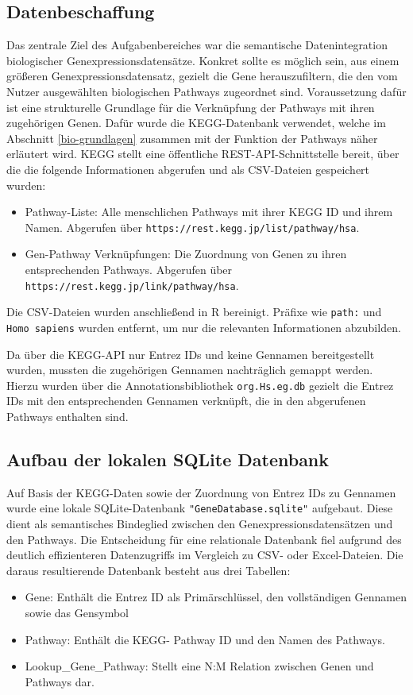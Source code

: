 \documentclass[12pt]{article}
\begin{document}
\subsection{Datenbeschaffung}
Das zentrale Ziel des Aufgabenbereiches war die semantische Datenintegration biologischer Genexpressionsdatensätze. Konkret sollte es möglich sein, aus einem größeren Genexpressionsdatensatz, gezielt die Gene herauszufiltern, die den vom Nutzer ausgewählten biologischen Pathways zugeordnet sind.
Voraussetzung dafür ist eine strukturelle Grundlage für die Verknüpfung der Pathways mit ihren zugehörigen Genen. Dafür wurde die KEGG-Datenbank verwendet, welche im Abschnitt \ref{bio-grundlagen} zusammen mit der Funktion der Pathways näher erläutert wird. KEGG stellt eine öffentliche REST-API-Schnittstelle bereit, über die die folgende Informationen abgerufen und als CSV-Dateien gespeichert wurden: 
\begin{itemize}
    \item Pathway-Liste: Alle menschlichen Pathways mit ihrer KEGG ID und ihrem Namen. Abgerufen über \texttt{https://\allowbreak rest.\allowbreak kegg.\allowbreak jp/\allowbreak list/\allowbreak pathway/\allowbreak hsa}.
    \item Gen-Pathway Verknüpfungen: Die Zuordnung von Genen zu ihren entsprechenden Pathways. Abgerufen über \texttt{https://\allowbreak rest.\allowbreak kegg.\allowbreak jp/\allowbreak link/\allowbreak pathway/\allowbreak hsa}.
\end{itemize}
\noindent Die CSV-Dateien wurden anschließend in R bereinigt. Präfixe wie \texttt{path:} und \texttt{Homo sapiens} wurden entfernt, um nur die relevanten Informationen abzubilden. 

\noindent Da über die KEGG-API nur Entrez IDs und keine Gennamen bereitgestellt wurden, mussten die zugehörigen Gennamen nachträglich gemappt werden. Hierzu wurden über die Annotationsbibliothek \texttt{org.Hs.eg.db} gezielt die Entrez IDs mit den entsprechenden Gennamen verknüpft, die in den abgerufenen Pathways enthalten sind.

\subsection{Aufbau der lokalen SQLite Datenbank}
Auf Basis der KEGG-Daten sowie der Zuordnung von Entrez IDs zu Gennamen wurde eine lokale SQLite-Datenbank \texttt{"GeneDatabase.sqlite"} aufgebaut. Diese dient als semantisches Bindeglied zwischen den Genexpressionsdatensätzen und den Pathways. Die Entscheidung für eine relationale Datenbank fiel aufgrund des deutlich effizienteren Datenzugriffs im Vergleich zu CSV- oder Excel-Dateien. Die daraus resultierende Datenbank besteht aus drei Tabellen: 
\begin{itemize}
    \item Gene: Enthält die Entrez ID als Primärschlüssel, den vollständigen Gennamen sowie das Gensymbol
    \item Pathway: Enthält die KEGG- Pathway ID und den Namen des Pathways.
    \item Lookup\_Gene\_Pathway: Stellt eine N:M Relation zwischen Genen und Pathways dar.
\end{itemize}
\end{document}

